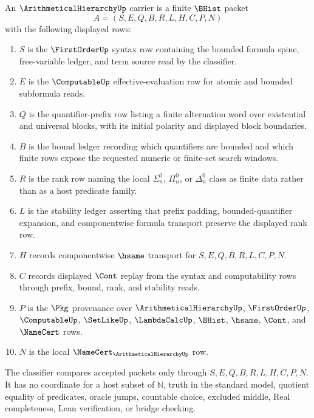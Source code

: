 \begin{definition}
\label{def:arithmetical-hierarchy-carrier}
An $\ArithmeticalHierarchyUp$ carrier is a finite $\BHist$ packet
$$
A=(S,E,Q,B,R,L,H,C,P,N)
$$
with the following displayed rows:
\begin{enumerate}
\item $S$ is the $\FirstOrderUp$ syntax row containing the bounded formula spine, free-variable ledger, and term source read by the classifier.
\item $E$ is the $\ComputableUp$ effective-evaluation row for atomic and bounded subformula reads.
\item $Q$ is the quantifier-prefix row listing a finite alternation word over existential and universal blocks, with its initial polarity and displayed block boundaries.
\item $B$ is the bound ledger recording which quantifiers are bounded and which finite rows expose the requested numeric or finite-set search windows.
\item $R$ is the rank row naming the local $\Sigma^0_n$, $\Pi^0_n$, or $\Delta^0_n$ class as finite data rather than as a host predicate family.
\item $L$ is the stability ledger asserting that prefix padding, bounded-quantifier expansion, and componentwise formula transport preserve the displayed rank row.
\item $H$ records componentwise $\hsame$ transport for $S,E,Q,B,R,L,C,P,N$.
\item $C$ records displayed $\Cont$ replay from the syntax and computability rows through prefix, bound, rank, and stability reads.
\item $P$ is the $\Pkg$ provenance over $\ArithmeticalHierarchyUp$, $\FirstOrderUp$, $\ComputableUp$, $\SetLikeUp$, $\LambdaCalcUp$, $\BHist$, $\hsame$, $\Cont$, and $\NameCert$ rows.
\item $N$ is the local $\NameCert_{\ArithmeticalHierarchyUp}$ row.
\end{enumerate}
The classifier compares accepted packets only through $S,E,Q,B,R,L,H,C,P,N$. It has no coordinate for a host subset of $\mathbb{N}$, truth in the standard model, quotient equality of predicates, oracle jumps, countable choice, excluded middle, Real completeness, Lean verification, or bridge checking.
\end{definition}

